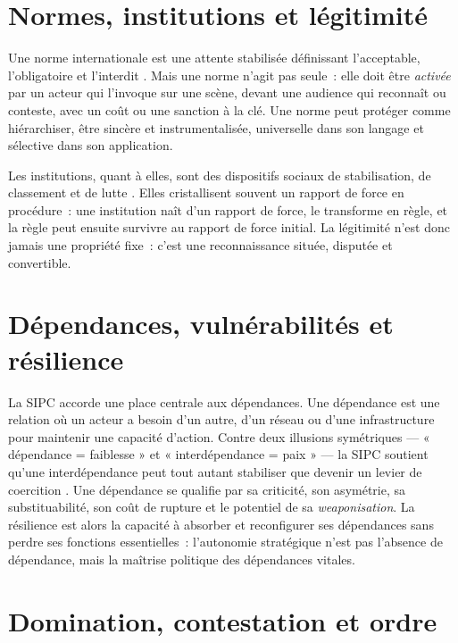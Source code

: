 \documentclass[11pt,a4paper]{article}
\begin{document}
\section{Normes, institutions et légitimité}

Une norme internationale est une attente stabilisée définissant l'acceptable, l'obligatoire et
l'interdit \autocite{finnemoreSikkink1998}. Mais une norme n'agit pas seule~: elle doit être
\emph{activée} par un acteur qui l'invoque sur une scène, devant une audience qui reconnaît ou
conteste, avec un coût ou une sanction à la clé. Une norme peut protéger comme hiérarchiser,
être sincère et instrumentalisée, universelle dans son langage et sélective dans son
application.

Les institutions, quant à elles, sont des dispositifs sociaux de stabilisation, de classement
et de lutte \autocite{barnettFinnemore2004}. Elles cristallisent souvent un rapport de force en
procédure~: une institution naît d'un rapport de force, le transforme en règle, et la règle peut
ensuite survivre au rapport de force initial. La légitimité n'est donc jamais une propriété
fixe~: c'est une reconnaissance située, disputée et convertible.

\section{Dépendances, vulnérabilités et résilience}

La SIPC accorde une place centrale aux dépendances. Une dépendance est une relation où un acteur
a besoin d'un autre, d'un réseau ou d'une infrastructure pour maintenir une capacité d'action.
Contre deux illusions symétriques --- « dépendance = faiblesse » et « interdépendance = paix »
\autocite{keohaneNye1977} --- la SIPC soutient qu'une interdépendance peut tout autant stabiliser
que devenir un levier de coercition \autocite{farrellNewman2019}. Une dépendance se qualifie par
sa criticité, son asymétrie, sa substituabilité, son coût de rupture et le potentiel de sa
\emph{weaponisation}. La résilience est alors la capacité à absorber et reconfigurer ses
dépendances sans perdre ses fonctions essentielles~: l'autonomie stratégique n'est pas l'absence
de dépendance, mais la maîtrise politique des dépendances vitales.

\section{Domination, contestation et ordre}
\end{document}
